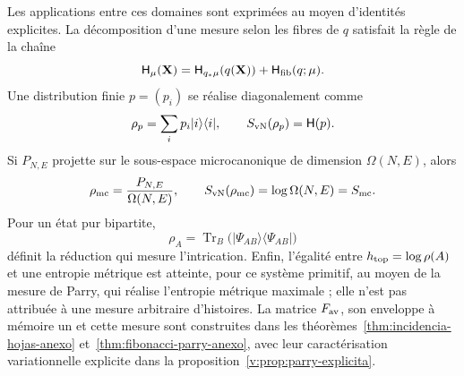 Les applications entre ces domaines sont exprimées au moyen d’identités explicites.
La décomposition d’une mesure selon les fibres de \(q\) satisfait la règle de
la chaîne
\begin{equation}
 \mathsf H_\mu(\mathbf X)
 =\mathsf H_{q_*\mu}(q(\mathbf X))
  +\mathsf H_{\rm fib}(q;\mu).
 \label{v:rec:eq:cadena-entropia-fibras-rev2}
\end{equation}
Une distribution finie \(p=(p_i)\) se réalise diagonalement comme
\[
 \rho_p=\sum_i p_i|i\rangle\langle i|,
 \qquad S_{\rm vN}(\rho_p)=\mathsf H(p).
\]
Si \(P_{N,E}\) projette sur le sous-espace microcanonique de dimension
\(\Omega(N,E)\), alors
\[
 \rho_{\rm mc}=\frac{P_{N,E}}{\Omega(N,E)},
 \qquad S_{\rm vN}(\rho_{\rm mc})=\log\Omega(N,E)=S_{\rm mc}.
\]
Pour un état pur bipartite,
\[
 \rho_A=\operatorname{Tr}_B
 \bigl(|\Psi_{AB}\rangle\langle\Psi_{AB}|\bigr)
\]
définit la réduction qui mesure l’intrication. Enfin, l’égalité entre
\(h_{\rm top}=\log\rho(A)\) et une entropie métrique est atteinte, pour ce
système primitif, au moyen de la mesure de Parry, qui réalise l’entropie métrique
maximale ; elle n’est pas attribuée à une mesure arbitraire d’histoires. La matrice
\(F_{\rm av}\), son enveloppe à mémoire un et cette mesure sont
construites dans les théorèmes~\ref{thm:incidencia-hojas-anexo}
et~\ref{thm:fibonacci-parry-anexo}, avec leur caractérisation variationnelle
explicite dans la proposition~\ref{v:prop:parry-explicita}.
